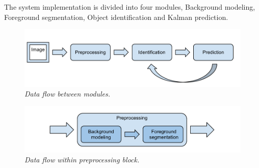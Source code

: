 The system implementation is divided into four modules, Background modeling, Foreground segmentation, Object identification and Kalman prediction. 

\begin{figure}[htb]
	\centering
	\includegraphics[width=\linewidth]{images/data_flow.png}
	\caption{\textit{Data flow between modules.}}
	\label{fig:block_overview_fig}  %
\end{figure}

\begin{figure}[htb]
	\centering
	\includegraphics[width=\linewidth]{images/data_flow_preprocessing.png}
	\caption{\textit{Data flow within preprocessing block.}}
	\label{fig:block_overview2_fig}  %
\end{figure}

